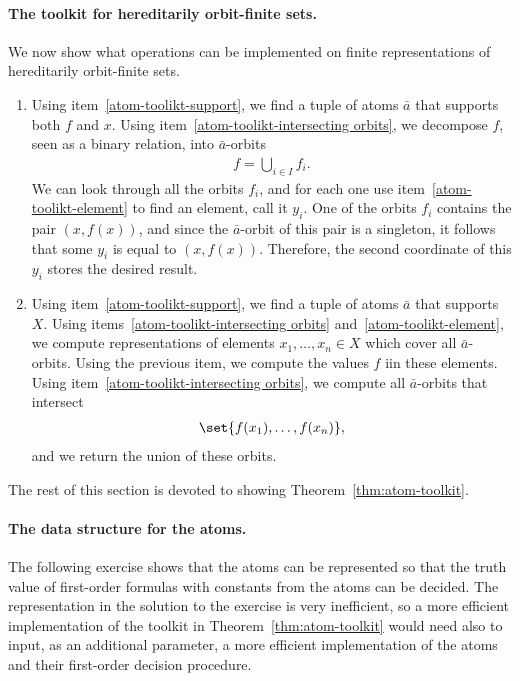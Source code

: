 \paragraph*{The toolkit for hereditarily orbit-finite sets.} We now show what operations can be implemented on finite representations of hereditarily orbit-finite sets.


{\begin{enumerate}
	\item Using item~\ref{atom-toolikt-support}, we find a tuple of atoms $\bar a$ that supports both $f$ and $x$. Using item~\ref{atom-toolikt-intersecting orbits}, we decompose $f$, seen as a binary relation, into $\bar a$-orbits
	\begin{align*}
		f = \bigcup_{i \in I} f_i.
	\end{align*}
	We can look through all the orbits $f_i$, and for each one use item~\ref{atom-toolikt-element} to find an element, call it $y_i$. 	One of the orbits $f_i$ contains the pair $(x,f(x))$, and since the $\bar a$-orbit of this pair is a singleton, it follows that some $y_i$ is equal to $(x,f(x))$. Therefore, the second coordinate of this $y_i$ stores the desired result.
	\item Using item~\ref{atom-toolikt-support}, we find a tuple of atoms $\bar a$ that supports $X$. Using items~\ref{atom-toolikt-intersecting orbits} and~\ref{atom-toolikt-element}, we compute representations of elements $x_1,\ldots,x_n \in X$ which cover all $\bar a$-orbits. Using the previous item, we compute the values $f$ iin these elements. Using item~\ref{atom-toolikt-intersecting orbits}, we compute all $\bar a$-orbits that intersect
\begin{align*}
	\set{f(x_1),\ldots,f(x_n)},
\end{align*}
and we return the union of these orbits.
	\end{enumerate}}

The rest of this section is devoted to showing Theorem~\ref{thm:atom-toolkit}.

\paragraph*{The data structure for the atoms.}
The following exercise shows that the atoms can be represented so that the truth value of first-order formulas with constants from the atoms can be decided. The representation in the solution to the exercise is very inefficient, so a more efficient implementation of the toolkit in Theorem~\ref{thm:atom-toolkit} would need also to input, as an additional parameter, a more efficient implementation of the atoms and their first-order decision procedure.


